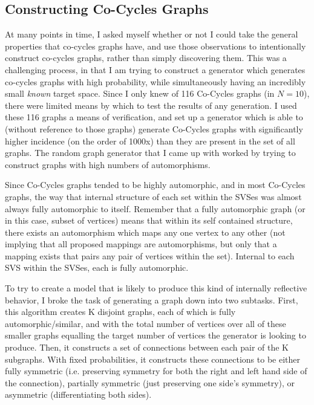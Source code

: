 \subsection{Constructing Co-Cycles Graphs}

At many points in time, I asked myself whether or not I could take the general properties that co-cycles graphs have, and use those observations to intentionally construct co-cycles graphs, rather than simply discovering them.
This was a challenging process, in that I am trying to construct a generator which generates co-cycles graphs with high probability, while simultaneously having an incredibly small \emph{known} target space.
Since I only knew of 116 Co-Cycles graphs (in $N=10$), there were limited means by which to test the results of any generation.
I used these 116 graphs a means of verification, and set up a generator which is able to (without reference to those graphs) generate Co-Cycles graphs with significantly higher incidence (on the order of 1000x) than they are present in the set of all graphs.
The random graph generator that I came up with worked by trying to construct graphs with high numbers of automorphisms.

Since Co-Cycles graphs tended to be highly automorphic, and in most Co-Cycles graphs, the way that internal structure of each set within the SVSes was almost always fully automorphic to itself.
Remember that a fully automorphic graph (or in this case, subset of vertices) means that within its self contained structure, there exists an automorphism which maps any one vertex to any other (not implying that all proposed mappings are automorphisms, but only that a mapping exists that pairs any pair of vertices within the set).
Internal to each SVS within the SVSes, each is fully automorphic.

To try to create a model that is likely to produce this kind of internally reflective behavior, I broke the task of generating a graph down into two subtasks.
First, this algorithm creates K disjoint graphs, each of which is fully automorphic/similar, and with the total number of vertices over all of these smaller graphs equalling the target number of vertices the generator is looking to produce.
Then, it constructs a set of connections between each pair of the K subgraphs.
With fixed probabilities, it constructs these connections to be either fully symmetric (i.e. preserving symmetry for both the right and left hand side of the connection), partially symmetric (just preserving one side's symmetry), or asymmetric (differentiating both sides).

